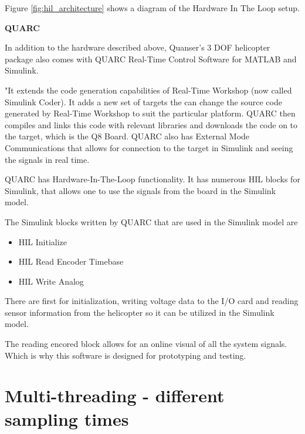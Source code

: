 Figure \ref{fig:hil_architecture} shows a diagram of the Hardware In The Loop setup. 

\textbf{QUARC}

In addition to the hardware described above, Quanser's 3 DOF helicopter package also comes with QUARC Real-Time Control Software for MATLAB and Simulink. 

"It extends the code generation capabilities of Real-Time Workshop (now called Simulink Coder). It adds a new set of targets the can change the source code generated by Real-Time Workshop to suit the particular platform. QUARC then compiles and links this code with relevant libraries and downloads the code on to the target, which is the Q8 Board. QUARC also has External Mode Communications that allows for connection to the target in Simulink and seeing the signals in real time. 

QUARC has Hardware-In-The-Loop functionality. It has numerous HIL blocks for Simulink, that allows one to use the signals from the board in the Simulink model.

The Simulink blocks written by QUARC that are used in the Simulink model are 
\begin{itemize}
    \item HIL Initialize 
    \item HIL Read Encoder Timebase 
    \item HIL Write Analog
\end{itemize}

There are first for initialization, writing voltage data to the I/O card and reading sensor information from the helicopter so it can be utilized in the Simulink model.

The reading encored block allows for an online visual of all the system signals. Which is why this software is designed for prototyping and testing.


\section{Multi-threading - different sampling times}

